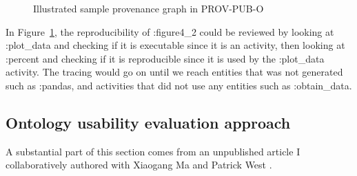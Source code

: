 \begin{figure}
	\caption{Illustrated sample provenance graph in PROV-PUB-O}
	\label{fig:prov-pub-example}
\end{figure}

In Figure~\ref{fig:prov-pub-example}, the reproducibility of :figure4\_2 could be reviewed by looking at :plot\_data and checking if it is executable since it is an activity, then looking at :percent and checking if it is reproducible since it is used by the :plot\_data activity. The tracing would go on until we reach entities that was not generated such as :pandas, and activities that did not use any entities such as :obtain\_data.






\subsection{Ontology usability evaluation approach}
\label{subsec:evaluation}

A substantial part of this section comes from an unpublished article I collaboratively authored with Xiaogang Ma and Patrick West \cite{fu2015ontology}.

